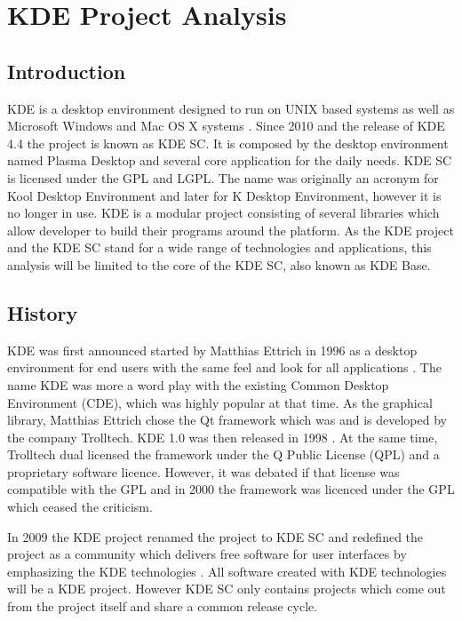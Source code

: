 \section{KDE Project Analysis} %
\label{sec:KDE Project Analysis}


\subsection{Introduction} %
\label{sub:Introduction}

KDE is a desktop environment designed to run on UNIX based systems as well as
Microsoft Windows and Mac OS X systems \cite{KDEPress,KDEAbout}. Since 2010 and
the release of KDE 4.4 the project is known as \ac{KDE SC}. It is composed by
the desktop environment named Plasma Desktop and several core application for
the daily needs. \ac{KDE SC} is licensed under the \ac{GPL} and \ac{LGPL}. The
name was originally an acronym for Kool Desktop Environment and later for K
Desktop Environment, however it is no longer in use. KDE is a modular project
consisting of several libraries which allow developer to build their programs
around the platform. As the KDE project and the \ac{KDE SC} stand for a wide
range of technologies and applications, this analysis will be limited to the
core of the \ac{KDE SC}, also known as KDE Base.


\subsection{History} %
\label{sub:History}

KDE was first announced started by Matthias Ettrich in 1996 as a desktop
environment for end users with the same feel and look for all applications
\cite{KDEAnnouncement}. The name KDE was more a word play with the existing
Common Desktop Environment (CDE), which was highly popular at that time. As the
graphical library, Matthias Ettrich chose the Qt framework which was and is
developed by the company Trolltech. KDE 1.0 was then released in 1998
\cite{KDEHistory}. At the same time, Trolltech dual licensed the framework
under the Q Public License (QPL) and a proprietary software licence. However,
it was debated if that license was compatible with the \ac{GPL} and in 2000 the
framework was licenced under the \ac{GPL} which ceased the criticism.

In 2009 the KDE project renamed the project to \ac{KDE SC} and redefined the
project as a community which delivers free software for user interfaces by
emphasizing the KDE technologies \cite{KDESC}. All software created with KDE
technologies will be a KDE project. However \ac{KDE SC} only contains projects
which come out from the project itself and share a common release cycle.

